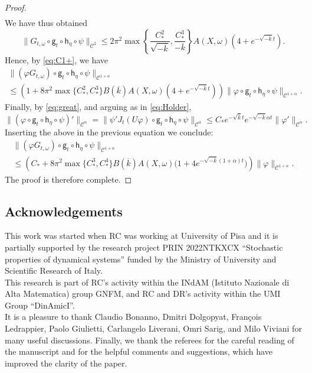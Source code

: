 \documentclass[11pt,letterpaper]{amsart}
\newcommand \cC {{\mathscr{C}}}
\newcommand{\horo}{\mathsf{h}}
\newcommand{\geo}{\mathsf{g}}
\theoremstyle{definition}
\begin{document}
\begin{proof}
\[\begin{split}
\end{split}
\]
We have thus obtained
\[
\|G_{t,\omega}\circ  \geo_t\circ \horo_\eta \circ \psi\|_{\cC^2}\le 2\pi^2\max\left\{\frac{C_*^2}{\sqrt{-\overline k}}, \frac{ C_*^3}{-\overline k}\right\}A(X,\omega)\left(4+e^{-\sqrt{-\overline k}t}\right).
\]
Hence, by \eqref{eq:C1+}, we have
\begin{multline*}
\|(\varphi G_{t,\omega})\circ \geo_t\circ \horo_\eta\circ \psi \|_{\cC^{1+\alpha}} \\ \le (1+8\pi^2\max\{C_*^2,C_*^3\}B(\overline k)A(X,\omega)(4+e^{-\sqrt{-\overline k}t}))\|\varphi\circ \geo_t\circ \horo_\eta\circ \psi \|_{\cC^{1+\alpha}}.
\end{multline*}
Finally, by \eqref{eq:great}, and arguing as in \eqref{eq:Holder},
\[
\|(\varphi\circ \geo_t\circ \horo_\eta\circ \psi)'\|_{\cC^{\alpha}}=\| \psi' J_t (U\varphi)\circ \geo_t\circ \horo_\eta \circ \psi\|_{\cC^\alpha}\le C_*e^{-\sqrt{\overline k}t}e^{-\sqrt{-\overline k} \alpha t}\|\varphi'\|_{\cC^\alpha}.
\]
Inserting the above in the previous equation we conclude:
\begin{multline*}
\|(\varphi G_{t,\omega})\circ \geo_t\circ \horo_\eta\circ \psi \|_{\cC^{1+\alpha}} \\ \le  \left(C_*+8\pi^2\max\{C_*^3,C_*^4\} B(\overline k)A(X,\omega)\big(1+4e^{-\sqrt{-\overline k}(1+\alpha)t}\big)\right)\|\varphi\|_{\cC^{1+\alpha}}.
\end{multline*}
The proof is therefore complete.
\end{proof}




\subsection*{Acknowledgements}
This work was started when RC was working at University of Pisa and it is partially supported by the research project PRIN 2022NTKXCX ``Stochastic properties of dynamical systems'' funded by the Ministry of University and Scientific Research of Italy.\\ This research is part of RC's activity within the INdAM (Istituto Nazionale di Alta Matematica) group GNFM, and RC and DR's activity within the UMI Group ``DinAmicI''.\\ It is a pleasure to thank Claudio Bonanno, Dmitri Dolgopyat, Fran\c cois Ledrappier, Paolo Giulietti, Carlangelo Liverani, Omri Sarig, and Milo Viviani for many useful discussions. Finally, we thank the referees for the careful reading of the manuscript and for the helpful comments and suggestions, which have improved the clarity of the paper. 
\end{document}
